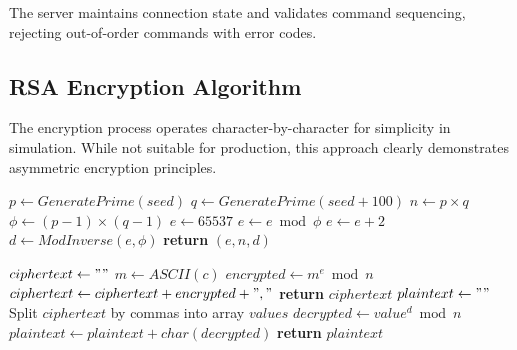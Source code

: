 \documentclass[12pt]{article}
\begin{document}
	The server maintains connection state and validates command sequencing, rejecting out-of-order commands with error codes.
	
	\subsection{RSA Encryption Algorithm}
	
	The encryption process operates character-by-character for simplicity in simulation. While not suitable for production, this approach clearly demonstrates asymmetric encryption principles.
	
	\begin{algorithm}[H]
		\caption{RSA Key Generation}
		\label{alg:rsa-keygen}
		\begin{algorithmic}[1]
			\State $p \gets GeneratePrime(seed)$ 
			\State $q \gets GeneratePrime(seed + 100)$ 
			\State $n \gets p \times q$ 
			\State $\phi \gets (p - 1) \times (q - 1)$ 
			\State $e \gets 65537$ 
			\State $e \gets e \bmod \phi$
			\EndIf
			\State $e \gets e + 2$
			\EndWhile
			\State $d \gets ModInverse(e, \phi)$ 
			\State \textbf{return} $(e, n, d)$ 
			\EndFunction
		\end{algorithmic}
	\end{algorithm}
	
	\begin{algorithm}[H]
		\caption{Message Encryption and Decryption}
		\label{alg:rsa-crypt}
		\begin{algorithmic}[1]
			\State $ciphertext \gets ""$
			\State $m \gets ASCII(c)$
			\State $encrypted \gets m^e \bmod n$ 
			\State $ciphertext \gets ciphertext + encrypted + ","$
			\EndFor
			\State \textbf{return} $ciphertext$
			\EndFunction
			\State
			\State $plaintext \gets ""$
			\State Split $ciphertext$ by commas into array $values$
			\State $decrypted \gets value^d \bmod n$ 
			\State $plaintext \gets plaintext + char(decrypted)$
			\EndFor
			\State \textbf{return} $plaintext$
			\EndFunction
		\end{algorithmic}
	\end{algorithm}
	
\end{document}
